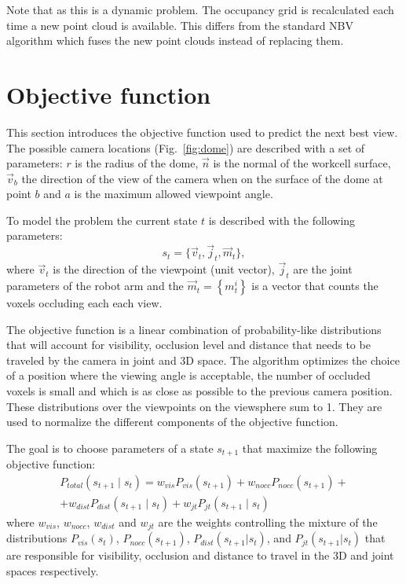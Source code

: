 \documentclass[10pt,twocolumn,letterpaper]{article}
\begin{document}
Note that as this is a dynamic problem. The occupancy grid is recalculated each time a new point cloud is available.
This differs from the standard NBV algorithm which fuses the new point clouds instead of replacing them.

\section{Objective function}\label{sec:obj-fun}
This section introduces the objective function used to predict the next best view. 
The possible camera locations (Fig.~\ref{fig:dome}) are described with a set of parameters: 
$r$ is the radius of the dome, 
$\vec{n}$ is the normal of the workcell surface, 
$\vec{v}_{b}$ the direction of the view of the camera when on the surface of the dome at point $b$ and 
$a$ is the maximum allowed viewpoint angle.

To model the problem the current state $t$ is described with the following parameters: 
\begin{equation}
s_{t} = \{\vec{v}_{t}, \vec{j}_{t}, \vec{m}_{t}\},
\end{equation}
where $\vec{v}_{t}$ is the direction of the viewpoint (unit vector),  
$\vec{j}_{t}$ are the joint parameters of the robot arm and the 
$\vec{m}_t = \left\lbrace m^i_t \right\rbrace $ is a vector that counts the voxels occluding each each view. 

The objective function is a linear combination of probability-like distributions that will account for visibility, occlusion level and distance that needs to be traveled by the camera in joint and 3D space. 
The algorithm optimizes the choice of a position where the viewing angle is acceptable, the number of occluded voxels is small and which is as close as possible to the previous camera position.
These distributions over the viewpoints on the viewsphere sum to 1. They are used to normalize the different components of the objective function. 

The goal is to choose parameters of a state $s_{t+1}$ that maximize the following objective function:
\begin{equation}
\begin{split}
P_{total}(s_{t+1}\mid s_{t}) = w_{vis}P_{vis}(s_{t+1}) + w_{nocc}P_{nocc}(s_{t+1}) + \\
+ w_{dist}P_{dist}(s_{t+1}\mid s_{t}) + w_{jt}P_{jt}(s_{t+1}\mid s_{t})
\end{split}
\label{eq:P-total}
\end{equation}
where $w_{vis}$, $w_{nocc}$, $w_{dist}$ and $w_{jt}$ are the weights controlling the mixture of the distributions 
$P_{vis}(s_{t})$, $P_{nocc}(s_{t+1})$, $P_{dist}(s_{t+1}|s_{t})$, and $P_{jt}(s_{t+1}|s_{t})$ 
that are responsible for visibility, occlusion and distance to travel in the 3D and joint spaces respectively. 
\end{document}
